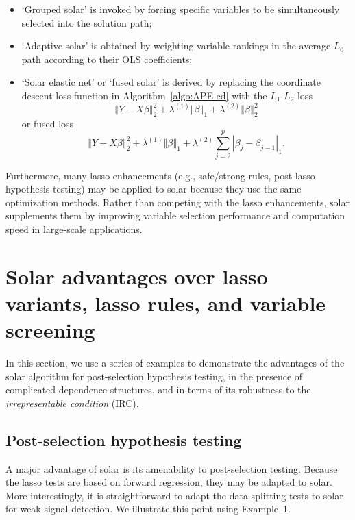 \documentclass[11pt,review,authoryear]{elsarticle}
\begin{document}
\begin{itemize}
  \item `Grouped solar' is invoked by forcing specific variables to be simultaneously selected into the solution path;
  \item `Adaptive solar' is obtained by weighting variable rankings in the average $L_0$ path according to their OLS coefficients;
  \item `Solar elastic net' or `fused solar' is derived by replacing the coordinate descent loss function in Algorithm~\ref{algo:APE-cd} with the $L_1$-$L_2$ loss
    \begin{equation}
      \left\Vert Y -X\beta \right\Vert_2^2 + \lambda^{(1)} \left\Vert \beta \right\Vert_1 + \lambda^{(2)} \left\Vert \beta \right\Vert_2^2
    \end{equation}
    or fused loss
    \begin{equation}
      \left\Vert Y -X\beta \right\Vert_2^2 + \lambda^{(1)} \left\Vert \beta \right\Vert_1 + \lambda^{(2)} \sum_{j=2}^{p} \left\vert \beta_j - \beta_{j-1} \right\vert_1.
    \end{equation}
\end{itemize}

Furthermore, many lasso enhancements (e.g., safe/strong rules, post-lasso hypothesis testing) may be applied to solar because they use the same optimization methods. Rather than competing with the lasso enhancements, solar supplements them by improving variable selection performance and computation speed in large-scale applications.

\section{Solar advantages over lasso variants, lasso rules, and variable screening \label{section:adv}}

In this section, we use a series of examples to demonstrate the advantages of the solar algorithm for post-selection hypothesis testing, in the presence of complicated dependence structures, and in terms of its robustness to the \emph{irrepresentable condition} (IRC).

\subsection{Post-selection hypothesis testing}

A major advantage of solar is its amenability to post-selection testing. Because the lasso tests \citep{lockhartall14, taylor2014exact} are based on forward regression, they may be adapted to solar. More interestingly, it is straightforward to adapt the data-splitting tests \citep{wasserman2009high,meinshausen2009p} to solar for weak signal detection. We illustrate this point using Example~1.
\end{document}
